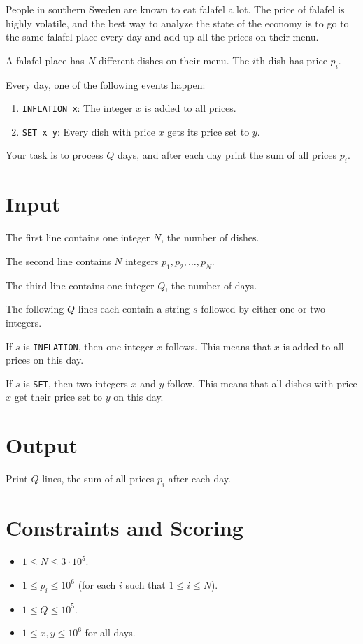People in southern Sweden are known to eat falafel a lot. The price of falafel is highly volatile, 
and the best way to analyze the state of the economy is to go to the same falafel place every 
day and add up all the prices on their menu.

A falafel place has $N$ different dishes on their menu. The $i$th dish has price $p_i$. 

Every day,
one of the following events happen:

\begin{enumerate}
    \item \verb|INFLATION x|: The integer $x$ is added to all prices.
    \item \verb|SET x y|: Every dish with price $x$ gets its price set to $y$.
\end{enumerate}

Your task is to process $Q$ days, and after each day print the sum of all prices $p_i$.

\section*{Input}
The first line contains one integer $N$, the number of dishes.

The second line contains $N$ integers $p_1, p_2, \ldots, p_N$.

The third line contains one integer $Q$, the number of days.

The following $Q$ lines each contain a string $s$ followed by either one or two integers. 

If $s$ is \verb|INFLATION|, then one integer $x$ follows. This means that $x$ is added to all prices
on this day.

If $s$ is \verb|SET|, then two integers $x$ and  $y$ follow. This means that all dishes with price $x$ get
their price set to $y$ on this day.


\section*{Output}
Print $Q$ lines, the sum of all prices $p_i$ after each day.

\section*{Constraints and Scoring}

\noindent
\begin{itemize}
  \item $1 \leq N \leq 3 \cdot 10^5$.
  \item $1 \leq p_i \leq 10^6$ (for each $i$ such that $1 \leq i \leq N$).
  \item $1 \leq Q \leq 10^5$.
  \item $1 \leq x,y \leq 10^6$ for all days. 
\end{itemize}

